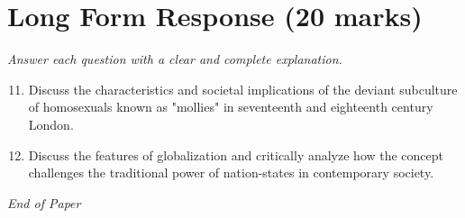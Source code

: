\documentclass[12pt]{article}
\begin{document}
\section*{Long Form Response (20 marks)}
\textit{Answer each question with a clear and complete explanation.}
\begin{enumerate}[label=\arabic*.]
\setcounter{enumi}{10}
\item Discuss the characteristics and societal implications of the deviant subculture of homosexuals known as "mollies" in seventeenth and eighteenth century London.
\item Discuss the features of globalization and critically analyze how the concept challenges the traditional power of nation-states in contemporary society.
\end{enumerate}

\vfill
\noindent\textit{End of Paper}
\end{document}

